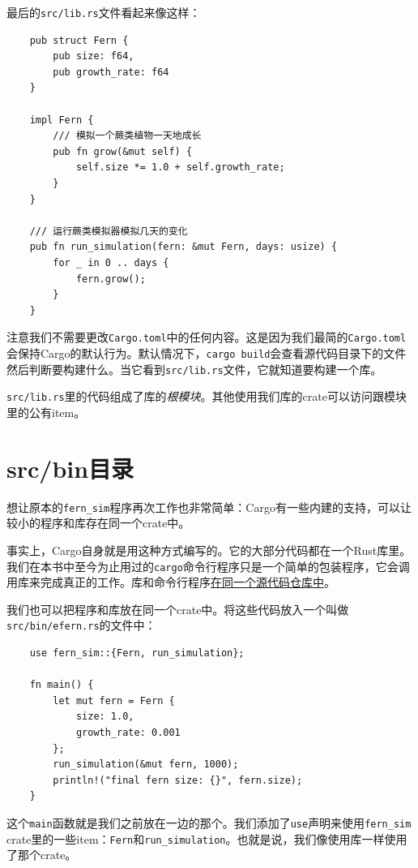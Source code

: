 最后的\texttt{src/lib.rs}文件看起来像这样：
\begin{verbatim}
    pub struct Fern {
        pub size: f64,
        pub growth_rate: f64
    }

    impl Fern {
        /// 模拟一个蕨类植物一天地成长
        pub fn grow(&mut self) {
            self.size *= 1.0 + self.growth_rate;
        }
    }

    /// 运行蕨类模拟器模拟几天的变化
    pub fn run_simulation(fern: &mut Fern, days: usize) {
        for _ in 0 .. days {
            fern.grow();
        }
    }
\end{verbatim}

注意我们不需要更改\texttt{Cargo.toml}中的任何内容。这是因为我们最简的\texttt{Cargo.toml}会保持Cargo的默认行为。默认情况下，\texttt{cargo build}会查看源代码目录下的文件然后判断要构建什么。当它看到\texttt{src/lib.rs}文件，它就知道要构建一个库。

\texttt{src/lib.rs}里的代码组成了库的\emph{根模块}。其他使用我们库的crate可以访问跟模块里的公有item。

\section{src/bin目录}

想让原本的\texttt{fern\_sim}程序再次工作也非常简单：Cargo有一些内建的支持，可以让较小的程序和库存在同一个crate中。

事实上，Cargo自身就是用这种方式编写的。它的大部分代码都在一个Rust库里。我们在本书中至今为止用过的\texttt{cargo}命令行程序只是一个简单的包装程序，它会调用库来完成真正的工作。库和命令行程序\href{https://github.com/rust-lang/cargo}{在同一个源代码仓库中}。

我们也可以把程序和库放在同一个crate中。将这些代码放入一个叫做\texttt{src/bin/efern.rs}的文件中：
\begin{verbatim}
    use fern_sim::{Fern, run_simulation};

    fn main() {
        let mut fern = Fern {
            size: 1.0,
            growth_rate: 0.001
        };
        run_simulation(&mut fern, 1000);
        println!("final fern size: {}", fern.size);
    }
\end{verbatim}

这个\texttt{main}函数就是我们之前放在一边的那个。我们添加了\texttt{use}声明来使用\texttt{fern\_sim} crate里的一些item：\texttt{Fern}和\texttt{run\_simulation}。也就是说，我们像使用库一样使用了那个crate。

